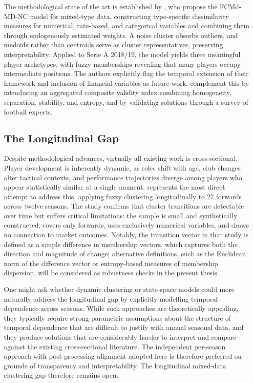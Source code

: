 \documentclass[a4paper,11pt]{report}
\begin{document}
The methodological state of the art is established by \cite{durso2022robust}, who propose the FCMd-MD-NC model for mixed-type data, constructing type-specific dissimilarity measures for numerical, rate-based, and categorical variables and combining them through endogenously estimated weights. A noise cluster absorbs outliers, and medoids rather than centroids serve as cluster representatives, preserving interpretability. Applied to Serie A 2018/19, the model yields three meaningful player archetypes, with fuzzy memberships revealing that many players occupy intermediate positions. The authors explicitly flag the temporal extension of their framework and inclusion of financial variables as future work. \cite{akhanli2023clustering} complement this by introducing an aggregated composite validity index combining homogeneity, separation, stability, and entropy, and by validating solutions through a survey of football experts.

\subsection{The Longitudinal Gap}

Despite methodological advances, virtually all existing work is cross-sectional. Player development is inherently dynamic, as roles shift with age, club changes alter tactical contexts, and performance trajectories diverge among players who appear statistically similar at a single moment. \cite{pacifico2025fuzzy} represents the most direct attempt to address this, applying fuzzy clustering longitudinally to 27 forwards across twelve seasons. The study confirms that cluster transitions are detectable over time but suffers critical limitations: the sample is small and synthetically constructed, covers only forwards, uses exclusively numerical variables, and draws no connection to market outcomes. Notably, the transition vector in that study is defined as a simple difference in membership vectors, which captures both the direction and magnitude of change; alternative definitions, such as the Euclidean norm of the difference vector or entropy-based measures of membership dispersion, will be considered as robustness checks in the present thesis.

One might ask whether dynamic clustering or state-space models could more naturally address the longitudinal gap by explicitly modelling temporal dependence across seasons. While such approaches are theoretically appealing, they typically require strong parametric assumptions about the structure of temporal dependence that are difficult to justify with annual seasonal data, and they produce solutions that are considerably harder to interpret and compare against the existing cross-sectional literature. The independent per-season approach with post-processing alignment adopted here is therefore preferred on grounds of transparency and interpretability. The longitudinal mixed-data clustering gap therefore remains open.
\end{document}

